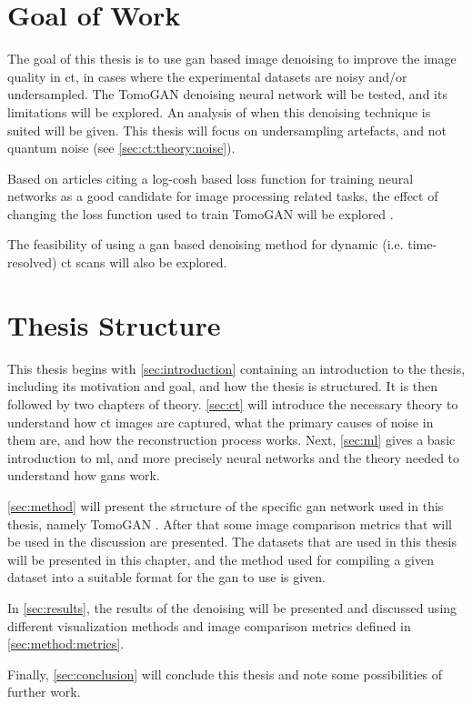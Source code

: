 \section{Goal of Work}
The goal of this thesis is to use \gls{gan} based image denoising to improve the image quality in \gls{ct}, in cases where the experimental datasets are noisy and/or undersampled. The TomoGAN \cite{liu2020tomogan} denoising neural network will be tested, and its limitations will be explored. An analysis of when this denoising technique is suited will be given. This thesis will focus on undersampling artefacts, and not quantum noise (see \cref{sec:ct:theory:noise}). 

Based on articles citing a log-cosh based loss function for training neural networks as a good candidate for image processing related tasks, the effect of changing the loss function used to train TomoGAN will be explored \cite{chen2019log,7797130}. 

The feasibility of using a \gls{gan} based denoising method for dynamic (i.e. time-resolved) \gls{ct} scans will also be explored. 

\section{Thesis Structure}
This thesis begins with \cref{sec:introduction} containing an introduction to the thesis, including its motivation and goal, and how the thesis is structured. It is then followed by two chapters of theory. \cref{sec:ct} will introduce the necessary theory to understand how \gls{ct} images are captured, what the primary causes of noise in them are, and how the reconstruction process works. Next, \cref{sec:ml} gives a basic introduction to \gls{ml}, and more precisely neural networks and the theory needed to understand how \gls{gan}s work. 

\cref{sec:method} will present the structure of the specific \gls{gan} network used in this thesis, namely TomoGAN \cite{liu2020tomogan}. After that some image comparison metrics that will be used in the discussion are presented. The datasets that are used in this thesis will be presented in this chapter, and the method used for compiling a given dataset into a suitable format for the \gls{gan} to use is given. 

In \cref{sec:results}, the results of the denoising will be presented and discussed using different visualization methods and image comparison metrics defined in \cref{sec:method:metrics}.

Finally, \cref{sec:conclusion} will conclude this thesis and note some possibilities of further work. 